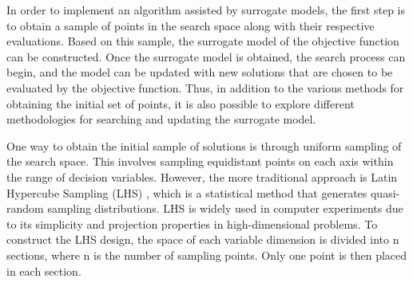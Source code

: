 			In order to implement an algorithm assisted by surrogate models, the first step is to obtain a sample of points in the search space along with their respective evaluations. Based on this sample, the surrogate model of the objective function can be constructed. Once the surrogate model is obtained, the search process can begin, and the model can be updated with new solutions that are chosen to be evaluated by the objective function. Thus, in addition to the various methods for obtaining the initial set of points, it is also possible to explore different methodologies for searching and updating the surrogate model.
			
			One way to obtain the initial sample of solutions is through uniform sampling of the search space. This involves sampling equidistant points on each axis within the range of decision variables. However, the more traditional approach is Latin Hypercube Sampling (LHS) \cite{iman1981apporach}, which is a statistical method that generates quasi-random sampling distributions. LHS is widely used in computer experiments due to its simplicity and projection properties in high-dimensional problems. To construct the LHS design, the space of each variable dimension is divided into n sections, where n is the number of sampling points. Only one point is then placed in each section.

